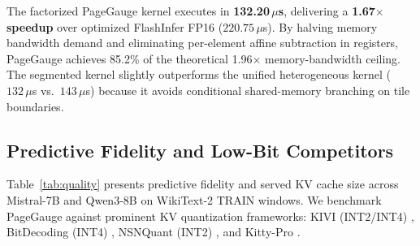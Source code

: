 \documentclass{article}
\begin{document}
The factorized PageGauge kernel executes in \textbf{132.20\,$\mu$s}, delivering a \textbf{1.67$\times$ speedup} over optimized FlashInfer FP16 ($220.75\,\mu$s). By halving memory bandwidth demand and eliminating per-element affine subtraction in registers, PageGauge achieves 85.2\% of the theoretical 1.96$\times$ memory-bandwidth ceiling. The segmented kernel slightly outperforms the unified heterogeneous kernel ($132\,\mu$s vs.\ $143\,\mu$s) because it avoids conditional shared-memory branching on tile boundaries.

\subsection{Predictive Fidelity and Low-Bit Competitors}
Table~\ref{tab:quality} presents predictive fidelity and served KV cache size across Mistral-7B and Qwen3-8B on WikiText-2 TRAIN windows. We benchmark PageGauge against prominent KV quantization frameworks: KIVI (INT2/INT4) \citep{liu2024kivi}, BitDecoding (INT4) \citep{du2026bitdecoding}, NSNQuant (INT2) \citep{son2025nsnquant}, and Kitty-Pro \citep{xia2026kitty}.
\end{document}
